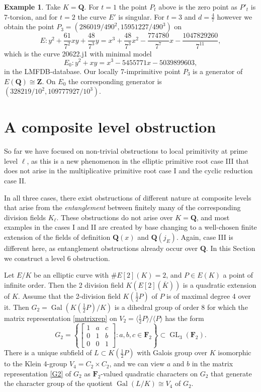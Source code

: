 \documentclass{amsart}
\theoremstyle{plain}
\theoremstyle{definition}
\newtheorem{example}[theorem]{Example}
\DeclareMathOperator{\GL}{GL}
\DeclareMathOperator{\Gal}{Gal}
\newcommand{\FF}{{\mathbf{F}}}
\newcommand{\Que}{{\mathbf{Q}}}
\newcommand{\Zee}{{\mathbf{Z}}}
\newcommand{\iso}{\cong}
\begin{document}
\begin{example}
Take $K=\Que$.
For $t=1$ the point $P_t$ above is the zero point as $P'_t$ is 
7-torsion, and for $t=2$ the curve $E'$ is singular.
For $t=3$ and $d=\frac47$ however we obtain the point 
$P_3=(286019/490^2, 15951227/490^3)$ on 
\[
\textstyle
E: y^2+\frac{61}{7^2}xy+\frac{48}{7^3}y=
x^3+\frac{48}{7^3}x^2-\frac{774780}{7^7}x-\frac{1047829260}{7^{11}},
\]
which is the curve 20622.j1 with minimal model 
\[
E_0: y^2+xy=x^3-5455771x-5039899603, 
\]
in the LMFDB-database.
Our locally 7-imprimitive point $P_3$ is a generator of $E(\Que)\iso\Zee$.
On $E_0$ the corresponding generator is $(328219/10^2, 109777927/10^3)$. 
\end{example}
\section{A composite level obstruction}
\label{S:A level 6 obstruction}

So far we have focused on non-trivial obstructions to
local primitivity at prime level $\ell$, as this is a new
phenomenon in the elliptic primitive root case III that 
does not arise in the multiplicative primitive root case I 
and the cyclic reduction case II.

In all three cases, there exist obstructions of different nature 
at composite levels that arise from the \emph{entanglement} between
finitely many of the corresponding division fields $K_\ell$.
These obstructions do not arise over $K=\Que$, and most examples 
in the cases I and II are created by base changing to a well-chosen finite extension of 
the fields of definition $\Que(x)$ and $\Que(j_E)$.
Again, case III is different here, as entanglement obstructions
already occur over $\Que$.
In this Section we construct a level 6 obstruction.

Let $E/K$ be an elliptic curve with $\#E[2](K)=2$, and 
$P\in E(K)$ a point of infinite order.
Then the 2 division field $K(E[2](\overline K))$ is a quadratic extension of $K$.
Assume that the 2-division field $K(\frac12 P)$ of $P$ is of maximal degree 4 over it.
Then $G_2=\Gal(K(\frac12 P)/K)$ is a dihedral group of order 8 for which 
the matrix representation \eqref{matrixrep} 
on $V_2=\langle\frac12 P\rangle/\langle P\rangle$ has the form
\begin{equation}
\label{G2}
G_2=
\left\{ \begin{bmatrix}
1 & a & c \\
0 & 1 & b \\
0 & 0 & 1 
\end{bmatrix}: a,b,c \in\FF_2  \right\}\subset \GL_3(\FF_2).
\end{equation}
There is a unique subfield of $L\subset K(\frac12 P)$ with Galois group 
over $K$ isomorphic to the Klein 4-group $V_4=C_2\times C_2$, 
and we can view $a$ and $b$ in the
matrix representation \eqref{G2} of $G_2$ as $\FF_2$-valued quadratic characters 
on $G_2$ that generate the character group of 
the quotient $\Gal(L/K)\iso V_4$ of $G_2$.
\end{document}
